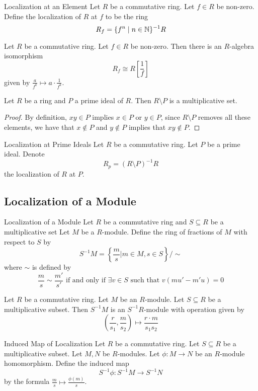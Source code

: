 \documentclass[a4paper]{article}
\begin{document}
\begin{defn}{Localization at an Element}{} Let $R$ be a commutative ring. Let $f\in R$ be non-zero. Define the localization of $R$ at $f$ to be the ring $$R_f=\{f^n\;|\;n\in\mathbb{N}\}^{-1}R$$
\end{defn}

\begin{lmm}{}{} Let $R$ be a commutative ring. Let $f\in R$ be non-zero. Then there is an $R$-algebra isomorphism $$R_f\cong R\left[\frac{1}{f}\right]$$ given by $\frac{a}{f^k}\mapsto a\cdot\frac{1}{f^k}$. 
\end{lmm}

\begin{lmm}{}{} Let $R$ be a ring and $P$ a prime ideal of $R$. Then $R\setminus P$ is a multiplicative set. \tcbline
\begin{proof}
By definition, $xy\in P$ implies $x\in P$ or $y\in P$, since $R\setminus P$ removes all these elements, we have that $x\notin P$ and $y\notin P$ implies that $xy\notin P$. 
\end{proof}
\end{lmm}

\begin{defn}{Localization at Prime Ideals}{} Let $R$ be a commutative ring. Let $P$ be a prime ideal. Denote $$R_p=(R\setminus P)^{-1}R$$ the localization of $R$ at $P$. 
\end{defn}

\subsection{Localization of a Module}
\begin{defn}{Localization of a Module}{} Let $R$ be a commutative ring and $S\subseteq R$ be a multiplicative set Let $M$ be a $R$-module. Define the ring of fractions of $M$ with respect to $S$ by $$S^{-1}M=\left\{\frac{m}{s}|m\in M,s\in S\right\}/\sim$$ where $\sim$ is defined by $$\frac{m}{s}\sim\frac{m'}{s'}\text{ if and only if }\exists v\in S\text{ such that }v(mu'-m'u)=0$$
\end{defn}

\begin{lmm}{}{} Let $R$ be a commutative ring. Let $M$ be an $R$-module. Let $S\subseteq R$ be a multiplicative subset. Then $S^{-1}M$ is an $S^{-1}R$-module with operation given by $$\left(\frac{r}{s_1},\frac{m}{s_2}\right)\mapsto\frac{r\cdot m}{s_1s_2}$$
\end{lmm}

\begin{defn}{Induced Map of Localization}{} Let $R$ be a commutative ring. Let $S\subseteq R$ be a multiplicative subset. Let $M,N$ be $R$-modules. Let $\phi:M\to N$ be an $R$-module homomorphism. Define the induced map $$S^{-1}\phi:S^{-1}M\to S^{-1}N$$ by the formula $\frac{m}{s}\mapsto\frac{\phi(m)}{s}$. 
\end{defn}
\end{document}

